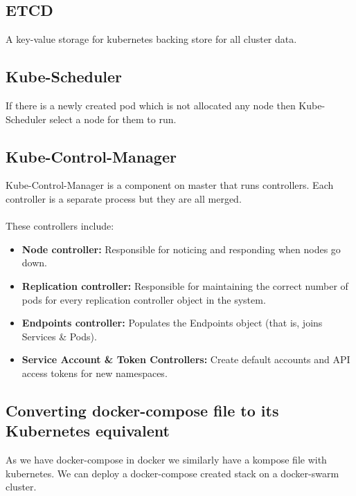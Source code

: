 \documentclass[12pt]{article}
\begin{document}
\subsection{ETCD}
A key-value storage for kubernetes backing store for all cluster data.
\subsection{Kube-Scheduler}
If there is a newly created pod which is not allocated any node then Kube-Scheduler select a node for them to run.
\subsection{Kube-Control-Manager}
Kube-Control-Manager is a component on master that runs controllers.
Each controller is a separate process but they are all merged.\\\\
These controllers include:
\begin{itemize}
	\item \textbf{Node controller:} Responsible for noticing and responding when nodes go down.
	\item \textbf{Replication controller:} Responsible for maintaining the correct number of pods for every replication controller object in the system.
	\item \textbf{Endpoints controller:} Populates the Endpoints object (that is, joins Services \& Pods).
	\item \textbf{Service Account \& Token Controllers:} Create default accounts and API access tokens for new namespaces.
\end{itemize}
\subsection{Converting docker-compose file to its Kubernetes equivalent}
As we have docker-compose in docker we similarly have a kompose file with kubernetes. We can deploy a docker-compose created stack on a docker-swarm cluster. 
\end{document}
